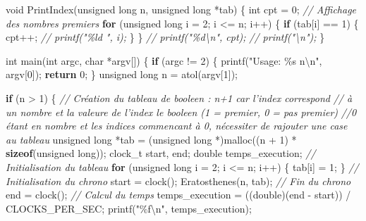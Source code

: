 \documentclass[
    ]{article}
\newenvironment{Shaded}{}{}
\newcommand{\CommentTok}[1]{\textcolor[rgb]{0.38,0.63,0.69}{\textit{#1}}}
\newcommand{\ControlFlowTok}[1]{\textcolor[rgb]{0.00,0.44,0.13}{\textbf{#1}}}
\newcommand{\DataTypeTok}[1]{\textcolor[rgb]{0.56,0.13,0.00}{#1}}
\newcommand{\DecValTok}[1]{\textcolor[rgb]{0.25,0.63,0.44}{#1}}
\newcommand{\KeywordTok}[1]{\textcolor[rgb]{0.00,0.44,0.13}{\textbf{#1}}}
\newcommand{\NormalTok}[1]{#1}
\newcommand{\SpecialCharTok}[1]{\textcolor[rgb]{0.25,0.44,0.63}{#1}}
\newcommand{\StringTok}[1]{\textcolor[rgb]{0.25,0.44,0.63}{#1}}
\begin{document}
\begin{Shaded}
\begin{Highlighting}[]
\DataTypeTok{void}\NormalTok{ PrintIndex(}\DataTypeTok{unsigned} \DataTypeTok{long}\NormalTok{ n, }\DataTypeTok{unsigned} \DataTypeTok{long}\NormalTok{ *tab)}
\NormalTok{\{}
    \DataTypeTok{int}\NormalTok{ cpt = }\DecValTok{0}\NormalTok{;}
    \CommentTok{// Affichage des nombres premiers}
    \ControlFlowTok{for}\NormalTok{ (}\DataTypeTok{unsigned} \DataTypeTok{long}\NormalTok{ i = }\DecValTok{2}\NormalTok{; i \textless{}= n; i++)}
\NormalTok{    \{}
        \ControlFlowTok{if}\NormalTok{ (tab[i] == }\DecValTok{1}\NormalTok{)}
\NormalTok{        \{}
\NormalTok{            cpt++;}
            \CommentTok{// printf("\%ld ", i);}
\NormalTok{        \}}
\NormalTok{    \}}
    \CommentTok{// printf("\%d\textbackslash{}n", cpt);}
    \CommentTok{// printf("\textbackslash{}n");}
\NormalTok{\}}

\DataTypeTok{int}\NormalTok{ main(}\DataTypeTok{int}\NormalTok{ argc, }\DataTypeTok{char}\NormalTok{ *argv[])}
\NormalTok{\{}
    \ControlFlowTok{if}\NormalTok{ (argc != }\DecValTok{2}\NormalTok{)}
\NormalTok{    \{}
\NormalTok{        printf(}\StringTok{"Usage: \%s n}\SpecialCharTok{\textbackslash{}n}\StringTok{"}\NormalTok{, argv[}\DecValTok{0}\NormalTok{]);}
        \ControlFlowTok{return} \DecValTok{0}\NormalTok{;}
\NormalTok{    \}}
    \DataTypeTok{unsigned} \DataTypeTok{long}\NormalTok{ n = atol(argv[}\DecValTok{1}\NormalTok{]);}

    \ControlFlowTok{if}\NormalTok{ (n \textgreater{} }\DecValTok{1}\NormalTok{)}
\NormalTok{    \{}
\CommentTok{   // Création du tableau de booleen : n+1 car l'index correspond }
\CommentTok{// à un nombre et la valeure de l'index le booleen (1 = premier, 0 = pas premier) }
\CommentTok{//0 étant en nombre et les indices commencant à 0, nécessiter de rajouter une case au tableau }
        \DataTypeTok{unsigned} \DataTypeTok{long}\NormalTok{ *tab = (}\DataTypeTok{unsigned} \DataTypeTok{long}\NormalTok{ *)malloc((n + }\DecValTok{1}\NormalTok{) * }\KeywordTok{sizeof}\NormalTok{(}\DataTypeTok{unsigned} \DataTypeTok{long}\NormalTok{));}
\NormalTok{        clock\_t start, end;}
        \DataTypeTok{double}\NormalTok{ temps\_execution;}
        \CommentTok{// Initialisation du tableau}
        \ControlFlowTok{for}\NormalTok{ (}\DataTypeTok{unsigned} \DataTypeTok{long}\NormalTok{ i = }\DecValTok{2}\NormalTok{; i \textless{}= n; i++)}
\NormalTok{        \{}
\NormalTok{            tab[i] = }\DecValTok{1}\NormalTok{;}
\NormalTok{        \}}
\CommentTok{         // Initialisation du chrono}
\NormalTok{        start = clock();}
\NormalTok{        Eratosthenes(n, tab);}
\CommentTok{        // Fin du chrono}
\NormalTok{        end = clock();}
\CommentTok{         // Calcul du temps}
\NormalTok{        temps\_execution = ((}\DataTypeTok{double}\NormalTok{)(end {-} start)) / CLOCKS\_PER\_SEC;}
\NormalTok{        printf(}\StringTok{"\%f}\SpecialCharTok{\textbackslash{}n}\StringTok{"}\NormalTok{, temps\_execution);}


\end{Highlighting}
\end{Shaded}
\end{document}
